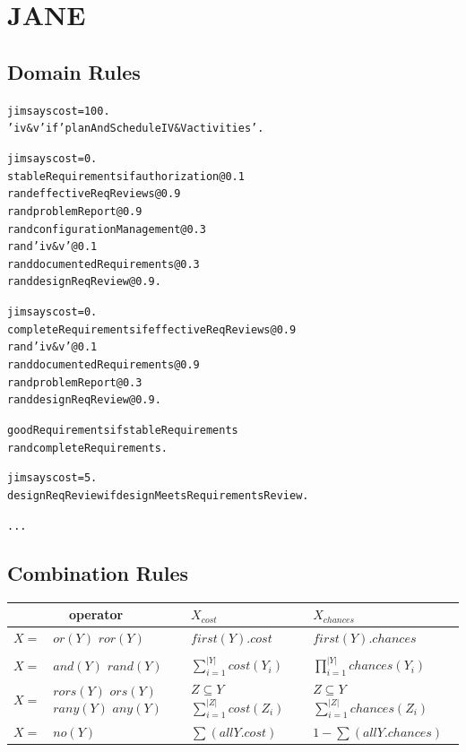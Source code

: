 \documentclass{article}
\begin{document}
\tableofcontents
\pagebreak
\section{JANE}
\subsection{Domain Rules}
{\footnotesize
\begin{alltt}
jim says cost=100.
'iv\&v' if 'planAndScheduleIV&Vactivities'.

jim says cost=0.
stableRequirements if authorization @0.1
                      rand effectiveReqReviews @0.9
                      rand problemReport @0.9
                      rand configurationManagement@0.3
                      rand 'iv&v'@0.1
                      rand documentedRequirements @0.3
                      rand designReqReview @0.9.

jim says cost=0.
completeRequirements if effectiveReqReviews @0.9
                         rand 'iv&v'@0.1
                         rand documentedRequirements @0.9
                         rand problemReport  @ 0.3
                         rand designReqReview @0.9.

goodRequirements if stableRequirements
                    rand completeRequirements.

jim says cost = 5.
designReqReview if designMeetsRequirementsReview.

...
\end{alltt}}

\subsection{Combination Rules}
\begin{center}
{\footnotesize
\begin{tabular}{|rp{0.4in}|p{0.75in}|p{1.05in}|}\hline
     \multicolumn{2}{|c|}{operator} &  $X_{cost}$ &  $X_{chances}$ \\\hline

$X=$&$or(Y)$
     $ror(Y)$     & $first(Y).cost$   &    $first(Y).chances$\\\hline

&&&\\
$X=$&$and(Y)$
   $rand(Y)$   &
\(\sum_{i=1}^{|Y|}cost(Y_i)\)
&
\(\prod_{i=1}^{|Y|}chances(Y_i)\) \\\hline

$X=$&$rors(Y)$
$ors(Y)$
$rany(Y)$
$any(Y)$       & $Z \subseteq Y$\newline
\(\sum_{i=1}^{|Z|}cost(Z_i)\)
& $Z \subseteq Y$\newline
\(\sum_{i=1}^{|Z|}chances(Z_i)\)\\\hline

$X=$&$no(Y)$&$\sum(allY.cost)$ & $1-\sum(allY.chances)$ \\\hline
\end{tabular}}
\end{center}
\end{document}
